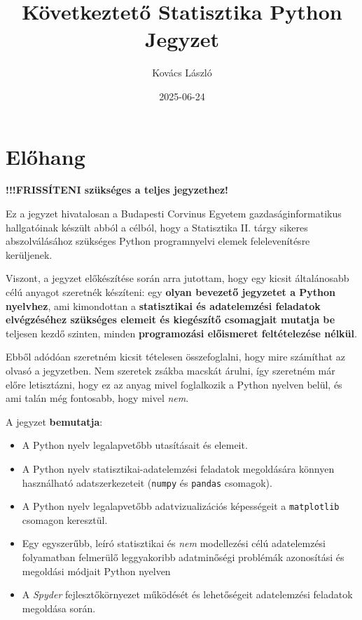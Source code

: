 \documentclass[
]{book}
\title{Következtető Statisztika Python Jegyzet}
\author{Kovács László}
\date{2025-06-24}
\providecommand{\tightlist}{%
  \setlength{\itemsep}{0pt}\setlength{\parskip}{0pt}}
\begin{document}
\maketitle

{
\setcounter{tocdepth}{1}
\tableofcontents
}
\chapter{Előhang}\label{elux151hang}

\textbf{!!!FRISSÍTENI szükséges a teljes jegyzethez!}

Ez a jegyzet hivatalosan a Budapesti Corvinus Egyetem gazdaságinformatikus hallgatóinak készült abból a célból, hogy a Statisztika II. tárgy sikeres abszolválásához szükséges Python programnyelvi elemek felelevenítésre kerüljenek.

Viszont, a jegyzet előkészítése során arra jutottam, hogy egy kicsit általánosabb célú anyagot szeretnék készíteni: egy \textbf{olyan bevezető jegyzetet a Python nyelvhez}, ami kimondottan a \textbf{statisztikai és adatelemzési feladatok elvégzéséhez szükséges elemeit és kiegészítő csomagjait mutatja be} teljesen kezdő szinten, minden \textbf{programozási előismeret feltételezése nélkül}.

Ebből adódóan szeretném kicsit tételesen összefoglalni, hogy mire számíthat az olvasó a jegyzetben. Nem szeretek zsákba macskát árulni, így szeretném már előre letisztázni, hogy ez az anyag mivel foglalkozik a Python nyelven belül, és ami talán még fontosabb, hogy mivel \emph{nem}.

A jegyzet \textbf{bemutatja}:

\begin{itemize}
\tightlist
\item
  A Python nyelv legalapvetőbb utasításait és elemeit.
\item
  A Python nyelv statisztikai-adatelemzési feladatok megoldására könnyen használható adatszerkezeteit (\texttt{numpy} és \texttt{pandas} csomagok).
\item
  A Python nyelv legalapvetőbb adatvizualizációs képességeit a \texttt{matplotlib} csomagon keresztül.
\item
  Egy egyszerűbb, leíró statisztikai és \emph{nem} modellezési célú adatelemzési folyamatban felmerülő leggyakoribb adatminőségi problémák azonosítási és megoldási módjait Python nyelven
\item
  A \emph{Spyder} fejlesztőkörnyezet működését és lehetőségeit adatelemzési feladatok megoldása során.
\end{itemize}
\end{document}
